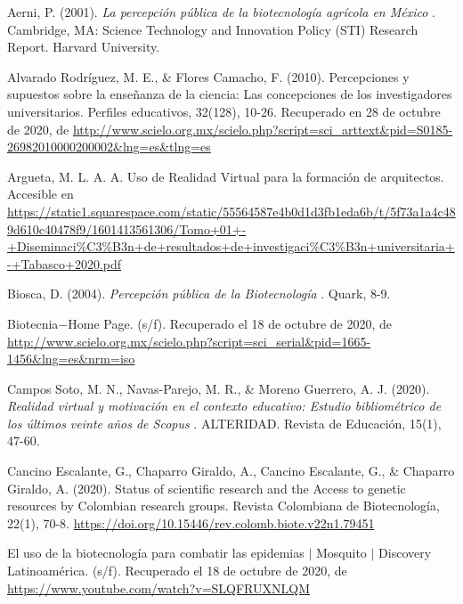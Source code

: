 \documentclass[12pt]{article}
\begin{document}
		



\newpage
{}
\begin{thebibliography}{X}
	
	Aerni, P. (2001). \textit{ La percepción pública de la biotecnología agrícola en México }. Cambridge, MA: Science Technology and Innovation Policy (STI) Research Report. Harvard University.

	\bibitem[Alvarado, 2010]{} Alvarado Rodríguez, M. E., \& Flores Camacho, F. (2010). Percepciones y supuestos sobre la enseñanza de la ciencia: Las concepciones de los investigadores universitarios. Perfiles educativos, 32(128), 10-26. Recuperado en 28 de octubre de 2020, de \url{http://www.scielo.org.mx/scielo.php?script=sci_arttext&pid=S0185-26982010000200002&lng=es&tlng=es}

	 Argueta, M. L. A. A. Uso de Realidad Virtual para la formación de arquitectos. Accesible en \url{https://static1.squarespace.com/static/55564587e4b0d1d3fb1eda6b/t/5f73a1a4c489d610c40478f9/1601413561306/Tomo+01+-+Diseminaci%C3%B3n+de+resultados+de+investigaci%C3%B3n+universitaria+-+Tabasco+2020.pdf}
	
	 Biosca, D. (2004). \textit{ Percepción pública de la Biotecnología }. Quark, 8-9.
	
	 Biotecnia$-$Home Page. (s/f). Recuperado el 18 de octubre de 2020, de \url{http://www.scielo.org.mx/scielo.php?script=sci_serial&pid=1665-1456&lng=es&nrm=iso}
	
	 Campos Soto, M. N., Navas-Parejo, M. R., \& Moreno Guerrero, A. J. (2020). \textit{ Realidad virtual y motivación en el contexto educativo: Estudio bibliométrico de los últimos veinte años de Scopus }. ALTERIDAD. Revista de Educación, 15(1), 47-60.

	 Cancino Escalante, G., Chaparro Giraldo, A., Cancino Escalante, G., \& Chaparro Giraldo, A. (2020). Status of scientific research and the Access to genetic resources by Colombian research groups. Revista Colombiana de Biotecnología, 22(1), 70-8. \url{https://doi.org/10.15446/rev.colomb.biote.v22n1.79451}

	 El uso de la biotecnología para combatir las epidemias $|$ Mosquito $|$ Discovery Latinoamérica. (s/f). Recuperado el 18 de octubre de 2020, de \url{https://www.youtube.com/watch?v=SLQFRUXNLQM}
	

\end{thebibliography}
\end{document}
